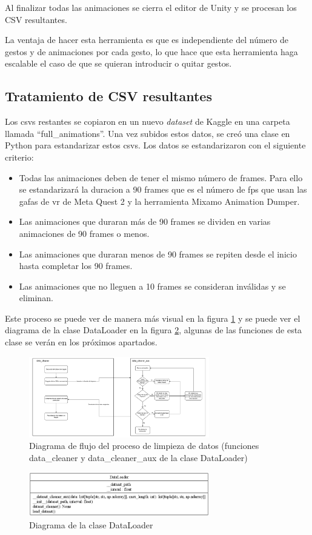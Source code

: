 Al finalizar todas las animaciones se cierra el editor de Unity y se procesan los CSV resultantes.

La ventaja de hacer esta herramienta es que es independiente del número de gestos y de animaciones por cada gesto, lo que hace que esta herramienta haga escalable el caso de que se quieran introducir o quitar gestos.

\subsection{Tratamiento de CSV resultantes}

Los \glspl{csv} restantes se copiaron en un nuevo \textit{dataset} de Kaggle en una carpeta llamada ``full\_animations''. Una vez subidos estos datos, se creó una clase en Python para estandarizar estos \glspl{csv}. Los datos se estandarizaron con el siguiente criterio:
\begin{itemize}
    \item Todas las animaciones deben de tener el mismo número de frames. Para ello se estandarizará la duracion a 90 frames que es el número de \gls{fps} que usan las gafas de \gls{vr} de Meta Quest 2 y la herramienta Mixamo Animation Dumper.
    \item Las animaciones que duraran más de 90 frames se dividen en varias animaciones de 90 frames o menos.
    \item Las animaciones que duraran menos de 90 frames se repiten desde el inicio hasta completar los 90 frames.
    \item Las animaciones que no lleguen a 10 frames se consideran inválidas y se eliminan.
\end{itemize}

Este proceso se puede ver de manera más visual en la figura \ref{fig:data_cleaner} y se puede ver el diagrama de la clase DataLoader en la figura \ref{fig:data_loader}, algunas de las funciones de esta clase se verán en los próximos apartados.

\begin{figure}[H]
    \centering
    \includegraphics[width=0.7\textwidth]{Imagenes/Vectorial/data_cleaner.pdf}
    \caption{Diagrama de flujo del proceso de limpieza de datos (funciones data\_cleaner y data\_cleaner\_aux de la clase DataLoader)}
    \label{fig:data_cleaner}
\end{figure}

\begin{figure}[H]
    \centering
    \includegraphics[width=0.7\textwidth]{Imagenes/Bitmap/DataLoader_UML.png}
    \caption{Diagrama de la clase DataLoader}
    \label{fig:data_loader}
\end{figure}